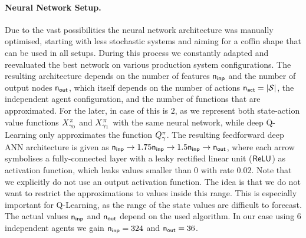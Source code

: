 \documentclass[envcountsame]{llncs}
\begin{document}
\paragraph*{Neural Network Setup.}
%
Due to the vast possibilities the neural network architecture was manually optimised, starting with
less stochastic systems and aiming for a coffin shape that can be used in all setups. During this
process we constantly adapted and reevaluated the best network on various production system
configurations. The resulting architecture depends on the number of features \(\mathsf{n_{inp}}\) and the
number of output nodes \(\mathsf{n_{out}}\), which itself depends on the number of actions
\(\mathsf{n_{act}} = \lvert{\mathcal{S}}\rvert\), the independent agent configuration, and the number of functions that
are approximated. For the later, in case of \ARA{} this is \(2\), as we represent both state-action
value functions \(X^\pi_{\gamma_{0}}\) and \(X^\pi_{\gamma_{1}}\) with the same neural network,
while deep Q-Learning \citep[cf.][]{mnih2015human} only approximates the function
\(Q_{\gamma}^\pi\).
%
The resulting feedforward deep ANN architecture is given as %
\(\anninp %
\rightarrow 1.75 \anninp %
\rightarrow 1.5 \anninp %
\rightarrow \annout %
\), where each arrow symbolises a fully-connected layer with a leaky rectified linear unit
(\(\mathsf{ReLU}\)) as activation function, which leaks values smaller than \(0\) with rate \(0.02\).
%
Note
that we explicitly do not use an output activation function. The idea is that we do not want to
restrict the approximations to values inside this range. This is especially important for
Q-Learning, as the range of the state values are difficult to forecast.
%
The actual values \(\mathsf{n_{inp}}\) and \(\mathsf{n_{out}}\) depend on the used algorithm. In our case using 6
independent agents we gain \(\mathsf{n_{inp}}=324\) and \(\mathsf{n_{out}}=36\).
%
%
\end{document}
